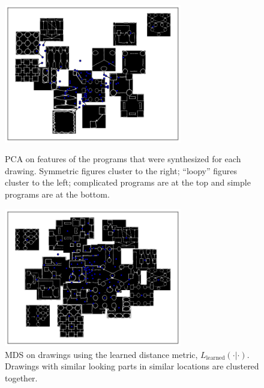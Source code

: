 \documentclass{article}
\begin{document}
\begin{figure}[h]
\centering  \begin{minipage}{\textwidth}\centering
  \includegraphics[width = 0.69\textwidth]{figures/PCA_improved.png}
    \caption{PCA on features of the programs that were synthesized for each drawing. Symmetric figures cluster to the right; ``loopy'' figures cluster to the left; complicated programs are at the top and simple programs are at the bottom.}    \label{NMF}
  \end{minipage} %
  \begin{minipage}{\textwidth}\centering
    \includegraphics[width = 0.69\textwidth]{figures/imageSimilarity.png} 
    \caption{MDS on drawings using the learned distance metric, $L_{\text{learned}}(\cdot|\cdot)$. Drawings with similar looking parts in similar locations are clustered together.}
  \end{minipage}
\end{figure}






\end{document}
